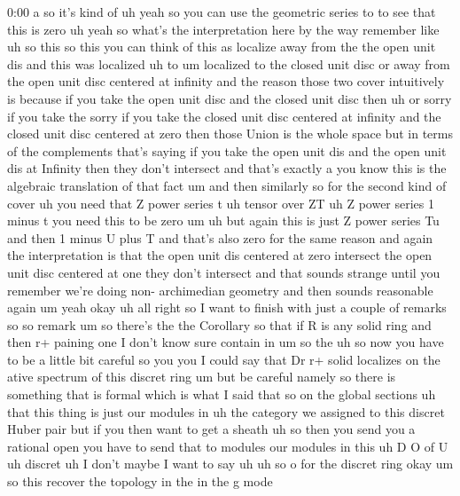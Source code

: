 \begin{unfinished}{0:00}
a
so  it's  kind
of
uh  yeah
so  you  can  use  the  geometric  series  to
to  see  that  this  is
zero  uh  yeah  so  what's  the
interpretation  here  by  the  way  remember
like  uh  so  this  so  this  you  can  think  of
this  as  localize
away  from  the  the  open  unit
dis  and  this  was
localized  uh
to  um  localized  to  the  closed  unit
disc  or  away  from  the  open  unit  disc
centered  at  infinity  and  the  reason
those  two  cover  intuitively  is  because
if  you  take  the  open  unit  disc  and  the
closed  unit  disc  then  uh  or  sorry  if  you
take  the  sorry  if  you  take  the  closed
unit  disc  centered  at  infinity  and  the
closed  unit  disc  centered  at  zero  then
those  Union  is  the  whole  space  but  in
terms  of  the  complements  that's  saying
if  you  take  the  open  unit  dis  and  the
open  unit  dis  at  Infinity  then  they
don't  intersect  and  that's  exactly  a  you
know  this  is  the  algebraic  translation
of  that
fact  um  and  then  similarly  so  for  the
second  kind  of  cover  uh  you  need  that  Z
power  series  t  uh  tensor  over
ZT  uh  Z  power  series  1  minus  t  you  need
this  to  be
zero
um  uh  but  again  this  is  just  Z  power
series  Tu  and  then  1  minus  U  plus
T  and  that's  also  zero  for  the  same
reason  and  again  the  interpretation  is
that  the  open  unit  dis  centered  at  zero
intersect  the  open  unit  disc  centered  at
one  they  don't  intersect  and  that  sounds
strange  until  you  remember  we're  doing
non-  archimedian  geometry  and  then
sounds  reasonable  again
um  yeah
okay  uh  all
right  so  I  want  to  finish  with  just  a
couple  of  remarks  so  so
remark
um  so  there's  the  the
Corollary  so  that  if  R  is  any  solid
ring  and  then  r+  paining  one  I  don't
know  sure  contain
in
um  so  the  uh  so  now  you  have  to  be  a
little  bit  careful  so  you  you  I  could
say  that  Dr  r+  solid
localizes  on  the  ative  spectrum  of  this
discret
ring
um  but  be
careful
namely  so  there  is  something  that  is
formal  which  is  what  I  said  that  so  on
the  global  sections  uh  that  this  thing
is  just  our  modules  in  uh  the  category
we  assigned  to  this  discret  Huber  pair
but  if  you  then  want  to  get  a  sheath  uh
so  then  you  send  you  a  rational  open
you  have  to  send  that  to  modules  our
modules  in  this  uh
D  O  of  U  uh  discret  uh  I  don't  maybe  I
want  to  say  uh  uh  so  o  for  the  discret
ring  okay
um  so  this  recover  the  topology  in  the
in  the  g  mode

\end{unfinished}
